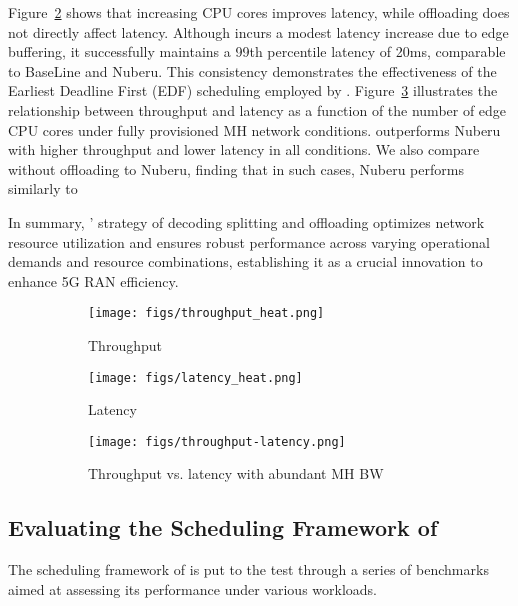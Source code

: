 Figure~\ref{fig:latency_heatma} shows that increasing CPU cores improves latency, while offloading does not directly affect latency. Although \Name{} incurs a modest latency increase due to edge buffering, it successfully maintains a 99th percentile latency of 20ms, comparable to BaseLine and Nuberu. This consistency demonstrates the effectiveness of the Earliest Deadline First (EDF) scheduling employed by \Name{}.
Figure~\ref{fig:throughput-latency} illustrates the relationship between throughput and latency as a function of the number of edge CPU cores under fully provisioned MH network conditions. \Name{} outperforms Nuberu with higher throughput and lower latency in all conditions. We also compare \Name{} without offloading to Nuberu, finding that in such cases, Nuberu performs similarly to \Name{}

In summary, \Name{}' strategy of decoding splitting and offloading optimizes network resource utilization and ensures robust performance across varying operational demands and resource combinations, establishing it as a crucial innovation to enhance 5G RAN efficiency.




\begin{figure}
\centering
\begin{subfigure}{\textwidth}
  \centering
  \texttt{[image: figs/throughput\_heat.png]}
  \caption{Throughput}
  \label{fig:throughput_heatmap}
\end{subfigure}%
\hfill
\begin{subfigure}{\textwidth}
  \centering
  \texttt{[image: figs/latency\_heat.png]}
  \caption{Latency}
  \label{fig:latency_heatma}
\end{subfigure}
\begin{subfigure}{.9\textwidth}
     \centering
  \texttt{[image: figs/throughput-latency.png]}
  \caption{Throughput vs. latency with abundant MH BW}
  \label{fig:throughput-latency}
\end{subfigure}
\caption{}
\label{fig:heatmap}
\end{figure}



\subsection{Evaluating the Scheduling Framework of \Name{}}
The scheduling framework of \Name{} is put to the test through a series of benchmarks aimed at assessing its performance under various workloads.

